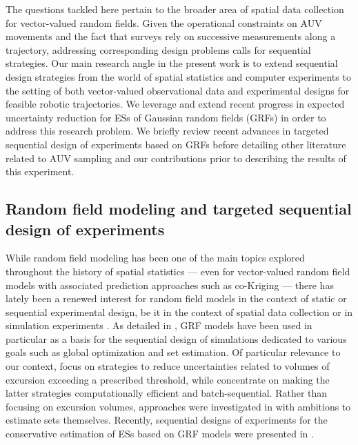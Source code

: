 \documentclass[aoas]{imsart}
\begin{document}
The questions tackled here pertain to the broader area of
spatial data collection for vector-valued random fields.
Given the operational constraints on AUV movements and the fact that
surveys rely on successive measurements along a trajectory, addressing
corresponding design problems calls for sequential strategies.  Our
main research angle in the present work is to extend sequential design
strategies from the world of spatial statistics and computer
experiments to the setting of both vector-valued observational data
and experimental designs for feasible robotic trajectories. We
leverage and extend recent progress in expected uncertainty reduction
for ESs of Gaussian random fields (GRFs) in order to address this
research problem. 
We briefly review recent advances in targeted sequential design of
experiments based on GRFs before detailing other literature related to
AUV sampling and our contributions prior to describing the results of this experiment.


\subsection{Random field modeling and targeted sequential design of experiments}
  
While random field modeling has been one of the main topics explored throughout
the history of spatial statistics \citep{Krige1951a,Stein1999} — even
for vector-valued random field models with associated prediction
approaches such as co-Kriging \citep[See, e.g.,][]{Wackernagel2003} —
there has lately been a renewed interest for random field models in
the context of static or sequential experimental design, be it in the
context of spatial data collection \citep{Mueller2007} or in
simulation experiments \citep{Santner.etal2003}. As detailed in
\cite{Ginsbourger2018}, GRF models have been used in particular as a
basis for the sequential design of simulations dedicated to various goals
such as global optimization and set estimation. Of particular
relevance to our context, \cite{Bect.etal2012} focus on strategies
to reduce uncertainties related to volumes of excursion exceeding a
prescribed threshold, while \cite{chevalier2014fast} concentrate on
making the latter strategies computationally efficient and
batch-sequential. Rather than focusing on excursion volumes,
approaches were investigated in
\cite{French.Sain2013,Chevalier.etal2013b,Bolin.Lindgren2015,Azzimonti.etal2016}
with ambitions to estimate sets themselves. Recently, sequential
designs of experiments for the conservative estimation of ESs based on
GRF models were presented in \cite{Azzimonti.etal}.
\end{document}
